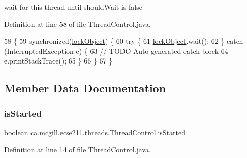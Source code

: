 wait for this thread until should\+Wait is false 

Definition at line 58 of file Thread\+Control.\+java.


\begin{DoxyCode}
58                                   \{
59     \textcolor{keyword}{synchronized}(\hyperlink{classca_1_1mcgill_1_1ecse211_1_1threads_1_1_thread_control_ab20c44ff2dafab8981c42fa8bf634dfc}{lockObject}) \{
60       \textcolor{keywordflow}{try} \{
61         \hyperlink{classca_1_1mcgill_1_1ecse211_1_1threads_1_1_thread_control_ab20c44ff2dafab8981c42fa8bf634dfc}{lockObject}.wait();
62       \} \textcolor{keywordflow}{catch} (InterruptedException e) \{
63         \textcolor{comment}{// TODO Auto-generated catch block}
64         e.printStackTrace();
65       \}
66     \}
67   \}
\end{DoxyCode}


\subsection{Member Data Documentation}
\mbox{\label{classca_1_1mcgill_1_1ecse211_1_1threads_1_1_thread_control_abb0ba2385c212f3d0d8435267d882536}} 
\subsubsection{\texorpdfstring{is\+Started}{isStarted}}
{\footnotesize\ttfamily boolean ca.\+mcgill.\+ecse211.\+threads.\+Thread\+Control.\+is\+Started\hspace{0.3cm}{\ttfamily [protected]}}



Definition at line 14 of file Thread\+Control.\+java.

\mbox{\label{classca_1_1mcgill_1_1ecse211_1_1threads_1_1_thread_control_ab20c44ff2dafab8981c42fa8bf634dfc}} 
